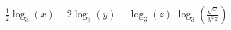 {$\frac{1}{2}\log_{3}(x) - 2\log_{3}(y) - \log_{3}(z)$}
{$\log_{3}\left(\frac{\sqrt{x}}{y^{2}z}\right)$}

